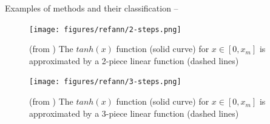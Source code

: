 \documentclass[presentation]{beamer}\mode<presentation>{\usetheme{AMSBolognaFC}}
\begin{document}
\begin{frame}[allowframebreaks]{Examples of methods and their classification -- }
    \begin{figure}\centering
        \texttt{[image: figures/refann/2-steps.png]}
        \caption{(from \cite{setiono2002extraction}) The $tanh(x)$ function (solid curve) for $x \in [0,x_m]$ is approximated by a 2-piece linear function (dashed lines)}
    \end{figure}

    \begin{figure}\centering
        \texttt{[image: figures/refann/3-steps.png]}
        \caption{(from \cite{setiono2002extraction}) The $tanh(x)$ function (solid curve) for $x \in [0,x_m]$ is approximated by a 3-piece linear function (dashed lines)}
    \end{figure}
    
\end{frame}

\section{\psyke}
\end{document}
